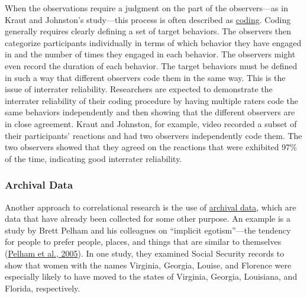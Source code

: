 \documentclass[
]{krantz}
\begin{document}
When the observations require a judgment on the part of the observers---as in Kraut and Johnston's study---this process is often described as \protect\hyperlink{coding}{coding}. Coding generally requires clearly defining a set of target behaviors. The observers then categorize participants individually in terms of which behavior they have engaged in and the number of times they engaged in each behavior. The observers might even record the duration of each behavior. The target behaviors must be defined in such a way that different observers code them in the same way. This is the issue of interrater reliability. Researchers are expected to demonstrate the interrater reliability of their coding procedure by having multiple raters code the same behaviors independently and then showing that the different observers are in close agreement. Kraut and Johnston, for example, video recorded a subset of their participants' reactions and had two observers independently code them. The two observers showed that they agreed on the reactions that were exhibited 97\% of the time, indicating good interrater reliability.

\hypertarget{archival-data}{%
\subsubsection*{Archival Data}\label{archival-data}}


Another approach to correlational research is the use of \protect\hyperlink{archival-data-1}{archival data}, which are data that have already been collected for some other purpose. An example is a study by Brett Pelham and his colleagues on ``implicit egotism''---the tendency for people to prefer people, places, and things that are similar to themselves (\protect\hyperlink{ref-pelham2005implicit}{Pelham et al., 2005}). In one study, they examined Social Security records to show that women with the names Virginia, Georgia, Louise, and Florence were especially likely to have moved to the states of Virginia, Georgia, Louisiana, and Florida, respectively.
\end{document}
